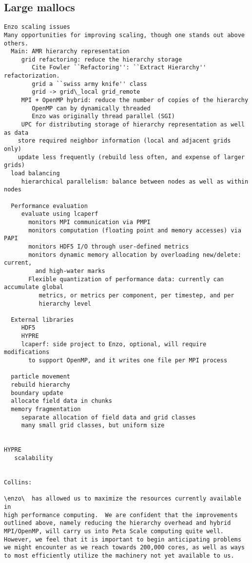 \documentclass{article}
\begin{document}
\subsection{Large mallocs} \label{solution:memory-management}


\begin{verbatim}
Enzo scaling issues
Many opportunities for improving scaling, though one stands out above others.
  Main: AMR hierarchy representation
     grid refactoring: reduce the hierarchy storage
        Cite Fowler ``Refactoring'': ``Extract Hierarchy'' refactorization.
        grid a ``swiss army knife'' class
        grid -> grid\_local grid_remote
     MPI + OpenMP hybrid: reduce the number of copies of the hierarchy
        OpenMP can by dynamically threaded
        Enzo was originally thread parallel (SGI)
     UPC for distributing storage of hierarchy representation as well as data
    store required neighbor information (local and adjacent grids only)
    update less frequently (rebuild less often, and expense of larger grids)
  load balancing
     hierarchical parallelism: balance between nodes as well as within nodes

  Performance evaluation     
     evaluate using lcaperf
       monitors MPI communication via PMPI
       monitors computation (floating point and memory accesses) via PAPI
       monitors HDF5 I/O through user-defined metrics
       monitors dynamic memory allocation by overloading new/delete: current,
         and high-water marks
       Flexible quantization of performance data: currently can accumulate global
          metrics, or metrics per component, per timestep, and per
          hierarchy level

  External libraries
     HDF5
     HYPRE
     lcaperf: side project to Enzo, optional, will require modifications
       to support OpenMP, and it writes one file per MPI process
    
  particle movement
  rebuild hierarchy
  boundary update
  allocate field data in chunks
  memory fragmentation
     separate allocation of field data and grid classes
     many small grid classes, but uniform size
  

HYPRE 
   scalability


Collins:

\enzo\  has allowed us to maximize the resources currently available in
high performance computing.  We are confident that the improvements
outlined above, namely reducing the hierarchy overhead and hybrid
MPI/OpenMP, will carry us into Peta Scale computing quite well.
However, we feel that it is important to begin anticipating problems
we might encounter as we reach towards 200,000 cores, as well as ways
to most efficiently utilize the machinery not yet available to us.


\end{verbatim}
\end{document}
